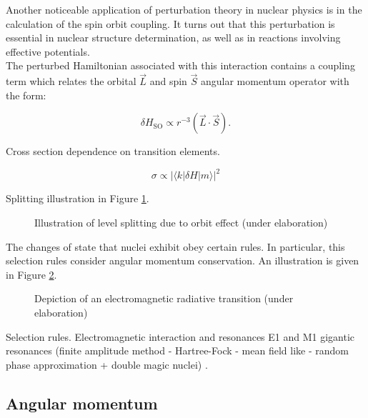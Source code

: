 \documentclass[openany]{book}
\begin{document}
Another noticeable application of perturbation theory in nuclear physics is in the calculation of the spin orbit coupling. It turns out that this perturbation is essential in nuclear structure determination, as well as in reactions involving effective potentials. \\

The perturbed Hamiltonian associated with this interaction contains a coupling term which relates the orbital  $\vec L$ and spin $\vec S$ angular momentum operator with the form:

\begin{equation} \label{eq:perturbationTheory_spinOrbit}
	\delta H_{\mathrm{SO}} \propto r^{-3} (\vec L \cdot \vec S).
\end{equation}

Cross section dependence on transition elements.

\begin{equation} \label{eq:perturbationTheory_crossSection}
	\sigma \propto |\langle k | \delta H|m \rangle|^2
\end{equation}

Splitting illustration in Figure \ref{fig:spinOrbitSplitting}.

\begin{figure}[H]
	
	\caption[Spin orbit splitting representation]{Illustration of level splitting due to orbit effect (under elaboration)}
	\label{fig:spinOrbitSplitting}
\end{figure}

The changes of state that nuclei exhibit obey certain rules. In particular, this selection rules consider angular momentum conservation. An illustration is given in Figure \ref{fig:radiativeEMTransition}. \\

\begin{figure}[H]
	
	\caption[Radiative transition illustration]{Depiction of an electromagnetic radiative transition (under elaboration)}
	\label{fig:radiativeEMTransition}
\end{figure}

Selection rules. Electromagnetic interaction and resonances E1 and M1 gigantic resonances (finite amplitude method - Hartree-Fock - mean field like - random phase approximation + double magic nuclei) \cite{sasaki_kawano_stetcu_2022}.

\subsection{Angular momentum}  \label{sub:quantumAngularMomentum}
\end{document}
